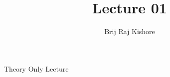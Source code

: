 \documentclass[12pt,twocolumn]{article}
\title{Lecture 01}
\date{}
\author{Brij Raj Kishore}
\begin{document}
	\maketitle
		Theory Only Lecture
\end{document}
